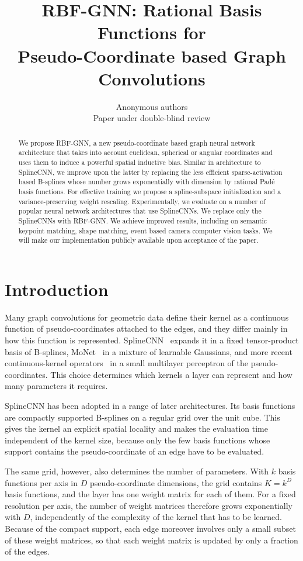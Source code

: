\documentclass{article} %
\title{RBF-GNN: Rational Basis Functions for\\Pseudo-Coordinate based Graph Convolutions}
\author{Anonymous authors \\
Paper under double-blind review}
\begin{document}
\maketitle

\begin{abstract}
We propose RBF-GNN, a new pseudo-coordinate based graph neural network
architecture that takes into account euclidean, spherical or angular
coordinates and uses them to induce a powerful spatial inductive bias.
Similar in architecture to SplineCNN, we improve upon the latter by replacing
the less efficient sparse-activation based B-splines whose number grows
exponentially with dimension by rational Pad\'e basis functions. For effective
training we propose a spline-subspace initialization and a variance-preserving
weight rescaling. Experimentally, we evaluate on a number of popular neural
network architectures that use SplineCNNs. We replace only the SplineCNNs with
RBF-GNN. We achieve improved results, including on semantic keypoint matching,
shape matching, event based camera computer vision tasks. We will make our
implementation publicly available upon acceptance of the paper.
\end{abstract}

\section{Introduction}
\label{sec:intro}

Many graph convolutions for geometric data define their kernel as a continuous
function of pseudo-coordinates attached to the edges, and they differ mainly in
how this function is represented. SplineCNN~\citep{fey2018splinecnn} expands it
in a fixed tensor-product basis of B-splines, MoNet~\citep{monti2017monet} in a
mixture of learnable Gaussians, and more recent continuous-kernel
operators~\citep{ma2024ckgconv} in a small multilayer perceptron of the
pseudo-coordinates. This choice determines which kernels a layer can represent
and how many parameters it requires.

SplineCNN has been adopted in a range of later architectures. Its basis
functions are compactly supported B-splines on a regular grid over the unit
cube. This gives the kernel an explicit spatial locality and makes the
evaluation time independent of the kernel size, because only the few basis
functions whose support contains the pseudo-coordinate of an edge have to be
evaluated.

The same grid, however, also determines the number of parameters. With $k$
basis functions per axis in $D$ pseudo-coordinate dimensions, the grid contains
$K = k^D$ basis functions, and the layer has one weight matrix for each of
them. For a fixed resolution per axis, the number of weight matrices therefore
grows exponentially with $D$, independently of the complexity of the kernel
that has to be learned. Because of the compact support, each edge moreover
involves only a small subset of these weight matrices, so that each weight
matrix is updated by only a fraction of the edges.
\end{document}
